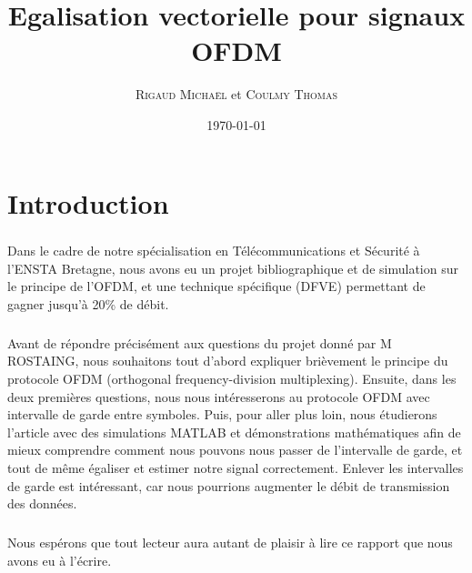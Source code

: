 \documentclass[a4paper, 11pt, oneside, oldfontcommands]{memoir}
\title{Egalisation vectorielle pour signaux OFDM}
\author{\textsc{Rigaud Michaël} et \textsc{Coulmy Thomas}}
\date{\today}
\newcounter{rem}[chapter]
\newcounter{th}[chapter]
\begin{document}
\maketitle
\thispagestyle{empty}
\newpage

\tableofcontents



\chapter*{Introduction}
\paragraph{}
Dans le cadre de notre spécialisation en Télécommunications et Sécurité à
l'ENSTA Bretagne, nous avons eu un projet bibliographique et de simulation sur
le principe de l'OFDM, et une technique spécifique (DFVE) permettant de gagner
jusqu'à 20\% de débit.
\paragraph{}
Avant de répondre précisément aux questions du projet donné par M ROSTAING, nous
souhaitons tout d’abord expliquer brièvement le principe du protocole OFDM (orthogonal frequency-division multiplexing).
Ensuite, dans les deux premières questions, nous nous intéresserons au protocole
OFDM avec intervalle de garde entre symboles. Puis, pour aller plus loin, nous
étudierons l’article \cite{sujet} avec des simulations MATLAB et démonstrations mathématiques afin de mieux comprendre comment nous pouvons nous passer de l'intervalle de garde, et tout de même égaliser et estimer notre signal correctement. Enlever les intervalles de garde est intéressant, car nous pourrions augmenter le débit de transmission des données.
\paragraph{}
Nous espérons que tout lecteur aura autant de plaisir à lire ce rapport que nous avons eu à l'écrire.
\newpage




\newpage








\end{document}
